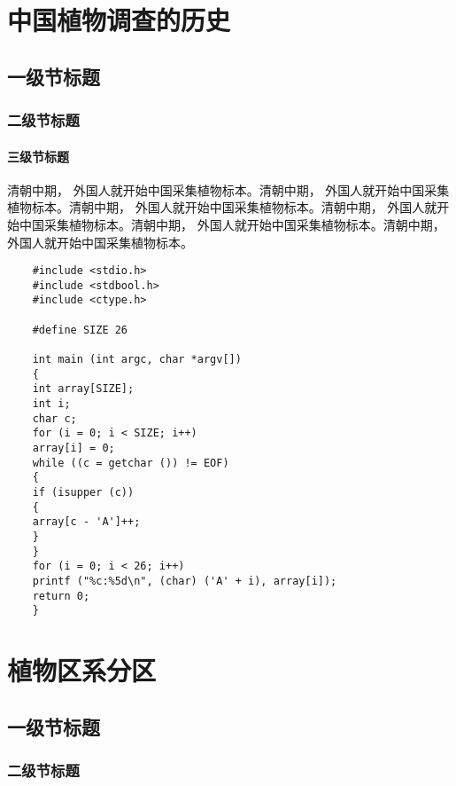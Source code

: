 \documentclass[utf8]{book}
\begin{document}
	\chapter{中国植物调查的历史}
	
	\section{一级节标题}
	
	\subsection{二级节标题}
	
	\subsubsection{三级节标题}
	
	\begin{multicols}{2}
		
		清朝中期， 外国人就开始中国采集植物标本。清朝中期， 外国人就开始中国采集植物标本。清朝中期， 外国人就开始中国采集植物标本。清朝中期， 外国人就开始中国采集植物标本。清朝中期， 外国人就开始中国采集植物标本。清朝中期， 外国人就开始中国采集植物标本。
	
	\end{multicols}
	\lstset{language=C}
	\begin{lstlisting}
	#include <stdio.h>
	#include <stdbool.h>
	#include <ctype.h>
	
	#define SIZE 26
	
	int main (int argc, char *argv[])
	{
	int array[SIZE];
	int i;
	char c;
	for (i = 0; i < SIZE; i++)
	array[i] = 0;
	while ((c = getchar ()) != EOF)
	{
	if (isupper (c))
	{
	array[c - 'A']++;
	}
	}
	for (i = 0; i < 26; i++)
	printf ("%c:%5d\n", (char) ('A' + i), array[i]);
	return 0;
	}
	\end{lstlisting}	
	\chapter{植物区系分区}
	
	\section{一级节标题}
	
	\subsection{二级节标题}
	
\end{document}
